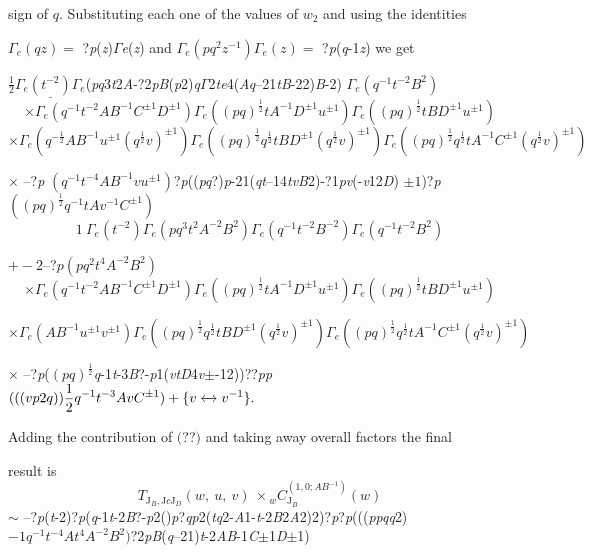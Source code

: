 \documentclass[a4paper,12pt]{article}
\begin{document}
sign of $q$. Substituting each one of the values of $w_{2}$ and using the identities

$\Gamma_{e}(qz)=$ ?{\it p}({\it z})$\Gamma${\it e}({\it z}) and $\Gamma_{e}(pq^{2}z^{-1})\Gamma_{e}(z)=$ ?{\it p}({\it q}-1{\it z}) we get

$\displaystyle \frac{1}{2}\underline{\Gamma_{e}(t^{-2})\Gamma_{e}}$({\it pq}3{\it t}2{\it A}-?2{\it pB}({\it p}2){\it q}$\Gamma$2{\it te}4({\it Aq}--21{\it tB}-22){\it B}-2) $\Gamma_{e}(q^{-1}t^{-2}B^{2})$
$$
\times\Gamma_{e}(q^{-1}t^{-2}AB^{-1}C^{\pm 1}D^{\pm 1})\Gamma_{e}((pq)^{\frac{1}{2}}tA^{-1}D^{\pm 1}u^{\pm 1})\Gamma_{e}((pq)^{\frac{1}{2}}tBD^{\pm 1}u^{\pm 1})
$$
$\times\Gamma_{e}(q^{-\frac{1}{2}}AB^{-1}u^{\pm 1}(q^{\frac{1}{2}}v)^{\pm 1})\Gamma_{e}((pq)^{\frac{1}{2}}q^{\frac{1}{2}}tBD^{\pm 1}(q^{\frac{1}{2}}v)^{\pm 1})\Gamma_{e}((pq)^{\frac{1}{2}}q^{\frac{1}{2}}tA^{-1}C^{\pm 1}(q^{\frac{1}{2}}v)^{\pm 1})$

$\times$ --?{\it p} $(q^{-1}t^{-4}AB^{-1}vu^{\pm 1})$?{\it p}(({\it pq}?){\it p}-21({\it qt}--14{\it tvB}2)-?1{\it pv}(-{\it v}12{\it D}) $\pm 1$)?{\it p} $((pq)^{\frac{1}{2}}q^{-1}tAv^{-1}C^{\pm 1})$
$$
1\ \Gamma_{e}(t^{-2})\Gamma_{e}(pq^{3}t^{2}A^{-2}B^{2})\Gamma_{e}(q^{-1}t^{-2}B^{-2})\Gamma_{e}(q^{-1}t^{-2}B^{2})
$$
\begin{center}
$+-2$--?$p (pq^{2}t^{4}A^{-2}B^{2})$
$$
\times\Gamma_{e}(q^{-1}t^{-2}AB^{-1}C^{\pm 1}D^{\pm 1})\Gamma_{e}((pq)^{\frac{1}{2}}tA^{-1}D^{\pm 1}u^{\pm 1})\Gamma_{e}((pq)^{\frac{1}{2}}tBD^{\pm 1}u^{\pm 1})
$$
\end{center}
$\times\Gamma_{e}(AB^{-1}u^{\pm 1}v^{\pm 1})\Gamma_{e}((pq)^{\frac{1}{2}}q^{\frac{1}{2}}tBD^{\pm 1}(q^{\frac{1}{2}}v)^{\pm 1})\Gamma_{e}((pq)^{\frac{1}{2}}q^{\frac{1}{2}}tA^{-1}C^{\pm 1}(q^{\frac{1}{2}}v)^{\pm 1})$

$\times$ --?{\it p}($(pq)^{\frac{1}{2}}${\it q}-1{\it t}-3{\it B}?-{\it p}1({\it vtD}4{\it v}$\pm$-12))??{\it pp} $(((vp2q))\displaystyle \frac{1}{2}q^{-1}t^{-3}AvC^{\pm 1})+\{v\xleftrightarrow{}v^{-1}\}.$

Adding the contribution of $($??$)$ and taking away overall factors the final

result is
$$
T_{\mathrm{J}_{B},\mathrm{J}c\mathrm{J}_{D}}(w,\ u,\ v)\ \times {}_{w}C_{\mathrm{J}_{B}}^{(1,0;AB^{-1})}(w)
$$
$\sim$ --?{\it p}({\it t}-2)?{\it p}({\it q}-1{\it t}-2{\it B}?-{\it p}2(){\it p}?{\it qp}2({\it tq}2-{\it A}1-{\it t}-2{\it B}2{\it A}2)2)?{\it p}?{\it p}((({\it ppqq}2) $-1q^{-1}t^{-4}At^{4}A^{-2}B^{2})$?2{\it pB}({\it q}--21){\it t}-2{\it AB}-1{\it C}$\pm$1{\it D}$\pm$1)
\end{document}
